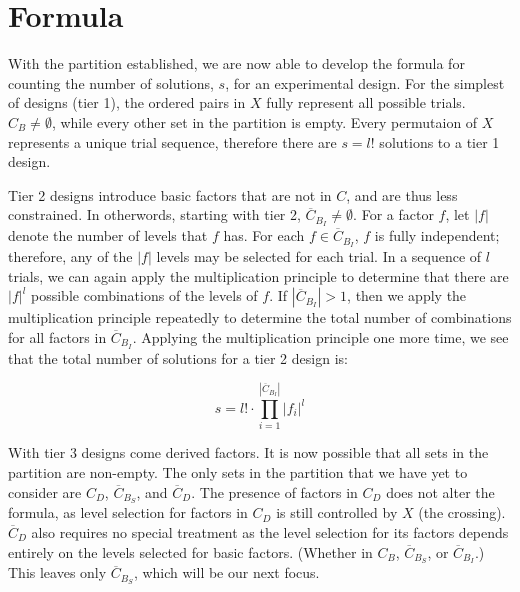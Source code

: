 \section{Formula}

With the partition established, we are now able to develop the formula for counting the number of solutions, $s$, for an experimental design. For the simplest of designs (tier 1), the ordered pairs in $X$ fully represent all possible trials. $C_B \neq \emptyset$, while every other set in the partition is empty. Every permutaion of $X$ represents a unique trial sequence, therefore there are $s = l!$ solutions to a tier 1 design.

Tier 2 designs introduce basic factors that are not in $C$, and are thus less constrained. In otherwords, starting with tier 2, $\overline{C}_{B_I} \neq \emptyset$. For a factor $f$, let $|f|$ denote the number of levels that $f$ has. For each $f \in \overline{C}_{B_I}$, $f$ is fully independent; therefore, any of the $|f|$ levels may be selected for each trial. In a sequence of $l$ trials, we can again apply the multiplication principle to determine that there are $|f|^l$ possible combinations of the levels of $f$. If $|\overline{C}_{B_I}| > 1$, then we apply the multiplication principle repeatedly to determine the total number of combinations for all factors in $\overline{C}_{B_I}$. Applying the multiplication principle one more time, we see that the total number of solutions for a tier 2 design is:

\[
s = l! \cdot \prod_{i=1}^{|\overline{C}_{B_I}|} |f_i|^l
\]


With tier 3 designs come derived factors. It is now possible that all sets in the partition are non-empty. The only sets in the partition that we have yet to consider are $C_D$, $\overline{C}_{B_S}$, and $\overline{C}_D$. The presence of factors in $C_D$ does not alter the formula, as level selection for factors in $C_D$ is still controlled by $X$ (the crossing). $\overline{C}_D$ also requires no special treatment as the level selection for its factors depends entirely on the levels selected for basic factors. (Whether in $C_B$, $\overline{C}_{B_S}$, or $\overline{C}_{B_I}$.) This leaves only $\overline{C}_{B_S}$, which will be our next focus.


